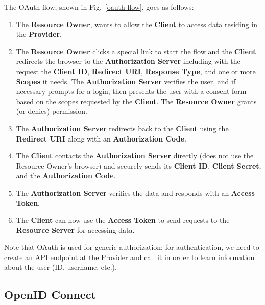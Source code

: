 	\pagebreak
	The OAuth flow, shown in Fig.~\ref{oauth-flow}, goes as follows:
	\begin{enumerate}
		\item The \textbf{Resource Owner}, wants to allow the \textbf{Client} to access data residing in the \textbf{Provider}.

		\item The \textbf{Resource Owner} clicks a special link to start the flow and the \textbf{Client} redirects the browser to the \textbf{Authorization Server} including with the request the \textbf{Client ID}, \textbf{Redirect URI}, \textbf{Response Type}, and one or more \textbf{Scopes} it needs. The \textbf{Authorization Server} verifies the user, and if necessary prompts for a login, then presents the user with a consent form based on the scopes requested by the \textbf{Client}. The \textbf{Resource Owner} grants (or denies) permission.

		\item The \textbf{Authorization Server} redirects back to the \textbf{Client} using the \textbf{Redirect URI} along with an \textbf{Authorization Code}.

		\item The \textbf{Client} contacts the \textbf{Authorization Server} directly (does not use the Resource Owner’s browser) and securely sends its \textbf{Client ID}, \textbf{Client Secret}, and the \textbf{Authorization Code}.

		\item The \textbf{Authorization Server} verifies the data and responds with an \textbf{Access Token}.

		\item The \textbf{Client} can now use the \textbf{Access Token} to send requests to the \textbf{Resource Server} for accessing data.
	\end{enumerate}

 Note that OAuth is used for generic authorization; for authentication, we need to create an API endpoint at the Provider and call it in order to learn information about the user (ID, username, etc.).



\subsection{OpenID Connect}

